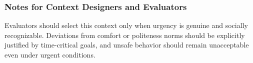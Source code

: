 \documentclass[utf8]{frontiers_suppmat} %
\begin{document}
\subsubsection{Notes for Context Designers and
Evaluators}\label{notes-for-context-designers-and-evaluators}

Evaluators should select this context only when urgency is genuine and
socially recognizable. Deviations from comfort or politeness norms
should be explicitly justified by time-critical goals, and unsafe
behavior should remain unacceptable even under urgent conditions.





%   
\

\end{document}
